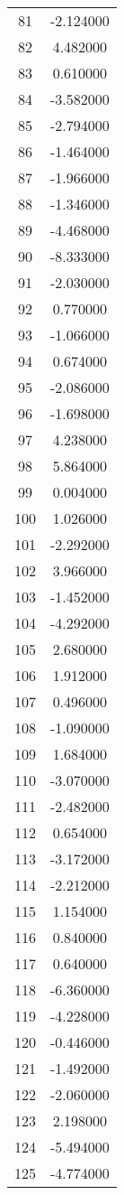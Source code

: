 \documentclass[12pt]{article}
\begin{document}
\begin{longtable}{@{}cc@{}}
81 & -2.124000 \\
82 & 4.482000 \\
83 & 0.610000 \\
84 & -3.582000 \\
85 & -2.794000 \\
86 & -1.464000 \\
87 & -1.966000 \\
88 & -1.346000 \\
89 & -4.468000 \\
90 & -8.333000 \\
91 & -2.030000 \\
92 & 0.770000 \\
93 & -1.066000 \\
94 & 0.674000 \\
95 & -2.086000 \\
96 & -1.698000 \\
97 & 4.238000 \\
98 & 5.864000 \\
99 & 0.004000 \\
100 & 1.026000 \\
101 & -2.292000 \\
102 & 3.966000 \\
103 & -1.452000 \\
104 & -4.292000 \\
105 & 2.680000 \\
106 & 1.912000 \\
107 & 0.496000 \\
108 & -1.090000 \\
109 & 1.684000 \\
110 & -3.070000 \\
111 & -2.482000 \\
112 & 0.654000 \\
113 & -3.172000 \\
114 & -2.212000 \\
115 & 1.154000 \\
116 & 0.840000 \\
117 & 0.640000 \\
118 & -6.360000 \\
119 & -4.228000 \\
120 & -0.446000 \\
121 & -1.492000 \\
122 & -2.060000 \\
123 & 2.198000 \\
124 & -5.494000 \\
125 & -4.774000 \\

\end{longtable}
\end{document}
